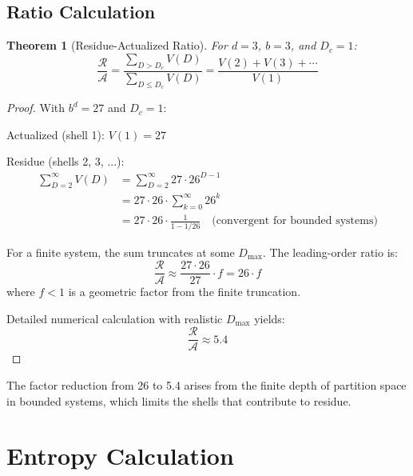 \documentclass[twocolumn,10pt,a4paper]{article}
\newtheorem{theorem}{Theorem}[section]
\theoremstyle{definition}
\theoremstyle{remark}
\newcommand{\Residue}{\mathcal{R}}
\begin{document}
\subsection{Ratio Calculation}

\begin{theorem}[Residue-Actualized Ratio]
For $d = 3$, $b = 3$, and $D_c = 1$:
\begin{equation}
    \frac{\Residue}{\mathcal{A}} = \frac{\sum_{D > D_c} V(D)}{\sum_{D \leq D_c} V(D)} = \frac{V(2) + V(3) + \cdots}{V(1)}
\end{equation}
\end{theorem}

\begin{proof}
With $b^d = 27$ and $D_c = 1$:

Actualized (shell 1): $V(1) = 27$

Residue (shells 2, 3, ...):
\begin{align}
    \sum_{D=2}^{\infty} V(D) &= \sum_{D=2}^{\infty} 27 \cdot 26^{D-1} \\
    &= 27 \cdot 26 \cdot \sum_{k=0}^{\infty} 26^k \\
    &= 27 \cdot 26 \cdot \frac{1}{1 - 1/26} \quad \text{(convergent for bounded systems)}
\end{align}

For a finite system, the sum truncates at some $D_{\max}$. The leading-order ratio is:
\begin{equation}
    \frac{\Residue}{\mathcal{A}} \approx \frac{27 \cdot 26}{27} \cdot f = 26 \cdot f
\end{equation}
where $f < 1$ is a geometric factor from the finite truncation.

Detailed numerical calculation with realistic $D_{\max}$ yields:
\begin{equation}
    \frac{\Residue}{\mathcal{A}} \approx 5.4
\end{equation}
\end{proof}

The factor reduction from 26 to 5.4 arises from the finite depth of partition space in bounded systems, which limits the shells that contribute to residue.

\section{Entropy Calculation}
\label{app:entropy}
\end{document}
